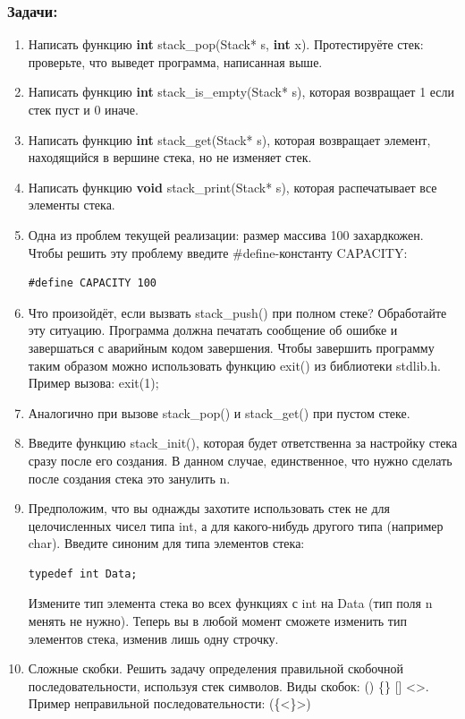 \documentclass{article}
\begin{document}
\subsubsection*{Задачи:}
\begin{enumerate}
\item Написать функцию \textbf{int} stack\_pop(Stack* s, \textbf{int} x). Протестируёте стек: проверьте, что выведет программа, написанная выше.
\item Написать функцию \textbf{int} stack\_is\_empty(Stack* s), которая возвращает 1 если стек пуст и 0 иначе.
\item Написать функцию \textbf{int} stack\_get(Stack* s), которая возвращает элемент, находящийся в вершине стека, но не изменяет стек.
\item Написать функцию \textbf{void} stack\_print(Stack* s), которая распечатывает все элементы стека.
\item Одна из проблем текущей реализации: размер массива 100 захардкожен. Чтобы решить эту проблему введите \#define-константу CAPACITY:
\begin{verbatim}
#define CAPACITY 100
\end{verbatim}
\item Что произойдёт, если вызвать stack\_push() при полном стеке? Обработайте эту ситуацию. Программа должна печатать сообщение об ошибке и завершаться с аварийным кодом завершения. Чтобы завершить программу таким образом можно использовать функцию exit() из библиотеки stdlib.h. Пример вызова: exit(1);
\item Аналогично при вызове stack\_pop() и stack\_get() при пустом стеке.
\item Введите функцию stack\_init(), которая будет ответственна за настройку стека сразу после его создания. В данном случае, единственное, что нужно сделать после создания стека это занулить n.
\item Предположим, что вы однажды захотите использовать стек не для целочисленных чисел типа int, а для какого-нибудь другого типа (например char). Введите синоним для типа элементов стека:
\begin{verbatim}
typedef int Data;
\end{verbatim}
Измените тип элемента стека во всех функциях с int на Data (тип поля n менять не нужно). Теперь вы в любой момент сможете изменить тип элементов стека, изменив лишь одну строчку.
\item Сложные скобки. Решить задачу определения правильной скобочной последовательности, используя стек символов. Виды скобок: () \{\} [] <>. Пример неправильной последовательности: (\{<\}>)

\end{enumerate}
\end{document}
